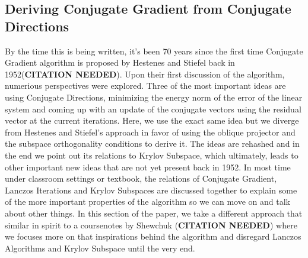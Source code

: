 \documentclass[]{article}
\theoremstyle{definition}
\begin{document}
     

    \subsection{Deriving Conjugate Gradient from Conjugate Directions}
        By the time this is being written, it's been 70 years since the first time Conjugate Gradient algorithm is proposed by Hestenes and Stiefel back in 1952(\textbf{CITATION NEEDED}). Upon their first discussion of the algorithm, numerious perspectives were explored. Three of the most important ideas are using Conjugate Directions, minimizing the energy norm of the error of the linear system and coming up with an update of the conjugate vectors using the residual vector at the current iterations. Here, we use the exact same idea but we diverge from Hestenes and Stiefel's approach in favor of using the oblique projector and the subspace orthogonality conditions to derive it. The ideas are rehashed and in the end we point out its relations to Krylov Subspace, which ultimately, leads to other important new ideas that are not yet present back in 1952. In most time under classroom settings or textbook, the relations of Conjugate Gradient, Lanczos Iterations and Krylov Subspaces are discussed together to explain some of the more important properties of the algorithm so we can move on and talk about other things. In this section of the paper, we take a different approach that similar in spirit to a coursenotes by Shewchuk (\textbf{CITATION NEEDED}) where we focuses more on that inspirations behind the algorithm and disregard Lanczos Algorithms and Krylov Subspace until the very end.  
\end{document}
